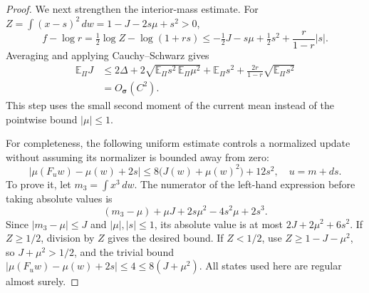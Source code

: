 \begin{proof}
We next strengthen the interior-mass estimate.  For
$Z=\int(x-s)^2\,dw=1-J-2s\mu+s^2>0$,
\[
 f-\log r=\tfrac12\log Z-\log(1+rs)
 \le-\tfrac12J-s\mu+\tfrac12s^2+\frac{r}{1-r}|s|.
\]
Averaging and applying Cauchy--Schwarz gives
\begin{align*}
 \mathbb E_\Pi J
 &\le2\Delta+2\sqrt{\mathbb E_\Pi s^2\,
                          \mathbb E_\Pi\mu^2}
      +\mathbb E_\Pi s^2
      +\frac{2r}{1-r}\sqrt{\mathbb E_\Pi s^2}\\
 &=O_{\bm\sigma}(C^2).
\end{align*}
This step uses the small second moment of the current mean instead of the
pointwise bound $|\mu|\le1$.

For completeness, the following uniform estimate controls a normalized
update without assuming its normalizer is bounded away from zero:
\begin{equation}\label{eq:r01-mean-remainder}
 \left|\mu(F_uw)-\mu(w)+2s\right|
 \le8\bigl(J(w)+\mu(w)^2\bigr)+12s^2,
 \quad u=m+ds.
\end{equation}
To prove it, let $m_3=\int x^3\,dw$.  The numerator of the left-hand
expression before taking absolute values is
\[
 (m_3-\mu)+\mu J+2s\mu^2-4s^2\mu+2s^3.
\]
Since $|m_3-\mu|\le J$ and $|\mu|,|s|\le1$, its absolute value is at most
$2J+2\mu^2+6s^2$.  If $Z\ge1/2$, division by $Z$ gives the desired
bound.  If $Z<1/2$, use
$Z\ge1-J-\mu^2$, so $J+\mu^2>1/2$, and the trivial bound
$|\mu(F_uw)-\mu(w)+2s|\le4\le8(J+\mu^2)$.
All states used here are regular almost surely.


\end{proof}
